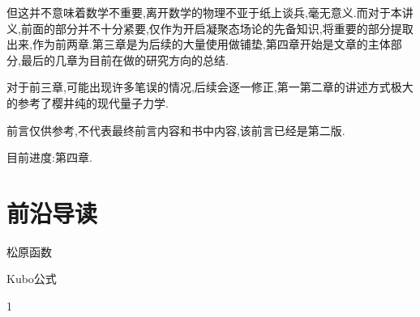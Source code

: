 \documentclass[lang=cn,newtx,10pt,scheme=chinese,thmcnt=section]{elegantbook}
\begin{document}
但这并不意味着数学不重要,离开数学的物理不亚于纸上谈兵,毫无意义.而对于本讲义,前面的部分并不十分紧要,仅作为开启凝聚态场论的先备知识,将重要的部分提取出来,作为前两章.第三章是为后续的大量使用做铺垫,第四章开始是文章的主体部分,最后的几章为目前在做的研究方向的总结.

对于前三章,可能出现许多笔误的情况,后续会逐一修正,第一第二章的讲述方式极大的参考了樱井纯的现代量子力学.

前言仅供参考,不代表最终前言内容和书中内容,该前言已经是第二版.



目前进度:第四章.

%
%












\chapter{前沿导读}
\begin{introduction}
	\item 松原函数
	\item Kubo公式
\end{introduction}
1
























\nocite{*}

\printbibliography[heading=bibintoc, title=\ebibname]
\appendix

\end{document}
